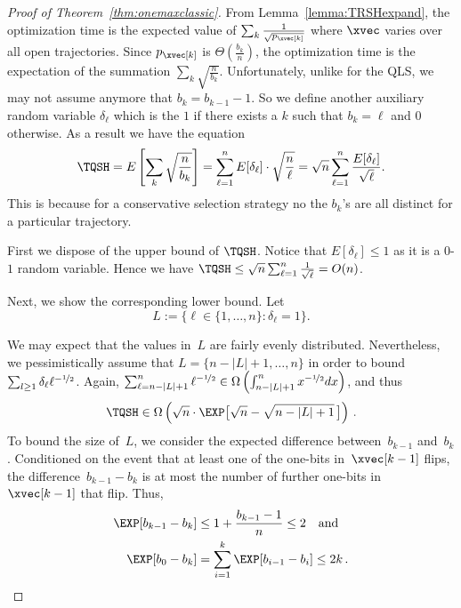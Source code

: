 \begin{proof}[Proof of Theorem~\ref{thm:onemaxclassic}]

  From Lemma~\ref{lemma:TRSHexpand}, the optimization time is the
  expected value of $\sum_k \frac{1}{\sqrt{p_{\xvec[k]}}}$ where
  $\xvec$ varies over all open trajectories. Since $p_{\xvec[k]}$ is
  $\Theta\left(\frac{b_k}{n}\right)$, the optimization time is the
  expectation of the summation $\sum_k \sqrt{\frac{n}{b_k}}$.
  Unfortunately, unlike for the QLS, we may not assume anymore that
  $b_k = b_{k-1}-1$. So we define another auxiliary random variable
  $\delta_{\ell}$ which is the $1$ if there exists a $k$ such that
  $b_k = \ell$ and $0$ otherwise. As a result we have the equation
  \begin{equation}\label{eqn:TQSHdelta}
  \TQSH = E \left[\sum_k \sqrt{\frac{n}{b_k}}\right] = \sum_{\ell=1}^n
  E[\delta_\ell] \cdot \sqrt{\frac{n}{\ell}} = \sqrt{n} \sum_{\ell=1}^n
  \frac{E[\delta_\ell]}{\sqrt{\ell}}.
  \end{equation}
  This is because for a conservative selection strategy no the $b_k$'s
  are all distinct for a particular trajectory.

  First we dispose of the upper bound of $\TQSH$. Notice that
  $E[\delta_{\ell}] \leq 1$ as it is a $0$-$1$ random variable. Hence
  we have $\TQSH \leq \sqrt{n} \sum_{\ell=1}^n \frac{1}{\sqrt{\ell}} =
  O(n)$.

  Next, we show the corresponding lower bound. Let
  \[L:=\{\ell\in\{1,\dots,n\}\colon \delta_\ell = 1\}.\]

We may expect that the values in~$L$ are fairly evenly distributed. Nevertheless, we pessimistically assume that $L=\{n-|L|+1,\dots,n\}$ in order to bound $\sum_{l\geq 1}\delta_\ell\ell^{-\nicefrac{1}{2}}$. Again, $\sum_{\ell=n-|L|+1}^n\ell^{-\nicefrac{1}{2}}\in\Omega\left(\int_{n-|L|+1}^n x^{-\nicefrac{1}{2}}dx\right)$, and thus
\begin{equation}
\label{eq:onemaxc}
   \TQSH\in\Omega\left(\sqrt{n}\cdot\EXP\big[\sqrt{n}-\sqrt{n-|L|+1}\,\big]\right)\,.
\end{equation}
To bound the size of~$L$, we consider the expected difference between~$b_{k-1}$ and~$b_k$. Conditioned on the event that at least one of the one-bits in~$\xvec[k-1]$ flips, the difference~$b_{k-1}-b_{k}$ is at most the number of further one-bits in~$\xvec[k-1]$ that flip. Thus,
\begin{align*}
\EXP[b_{k-1}-b_{k}]&\le 1+\frac{b_{k-1}-1}{n}\le 2\quad\textnormal{and} \\
\EXP[b_0-b_k]&=\sum_{i=1}^{k}\EXP[b_{i-1}-b_i]\le 2k\,.
\end{align*}


\end{proof}
